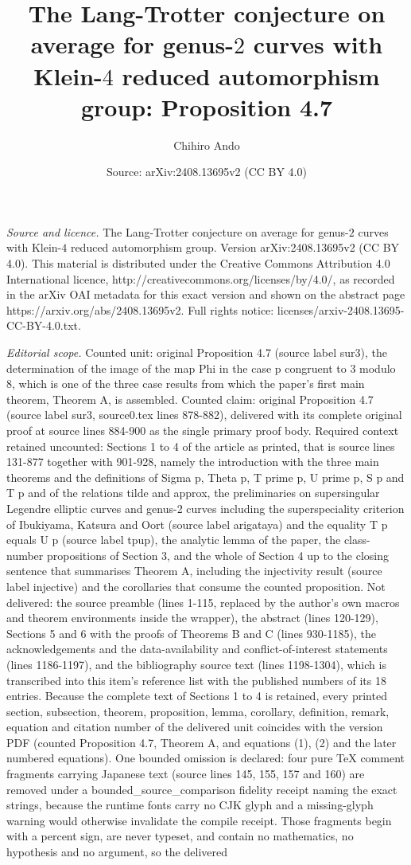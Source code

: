 \documentclass[10pt,a4paper]{amsart}
\title[The Lang-Trotter conjecture on average for genus-2 curves: Proposition4.7]{The Lang-Trotter conjecture on average for genus-$2$ curves with Klein-$4$ reduced automorphism group: Proposition 4.7}
\author{Chihiro Ando}
\date{Source: arXiv:2408.13695v2 (CC BY 4.0)}
\theoremstyle{plain}
\begin{document}
\maketitle
\noindent\emph{Source and licence.} The Lang-Trotter conjecture on average for genus-$2$ curves with Klein-$4$ reduced automorphism group. Version arXiv:2408.13695v2 (CC BY 4.0). This material is distributed under the Creative Commons Attribution 4.0 International licence, http://creativecommons.org/licenses/by/4.0/, as recorded in the arXiv OAI metadata for this exact version and shown on the abstract page https://arxiv.org/abs/2408.13695v2. Full rights notice: licenses/arxiv-2408.13695-CC-BY-4.0.txt.\par\smallskip
\noindent\textit{Editorial scope.} Counted unit: original Proposition 4.7 (source label sur3), the determination of the image of the map Phi in the case p congruent to 3 modulo 8, which is one of the three case results from which the paper's first main theorem, Theorem A, is assembled. Counted claim: original Proposition 4.7 (source label sur3, source0.tex lines 878-882), delivered with its complete original proof at source lines 884-900 as the single primary proof body. Required context retained uncounted: Sections 1 to 4 of the article as printed, that is source lines 131-877 together with 901-928, namely the introduction with the three main theorems and the definitions of Sigma p, Theta p, T prime p, U prime p, S p and T p and of the relations tilde and approx, the preliminaries on supersingular Legendre elliptic curves and genus-2 curves including the superspeciality criterion of Ibukiyama, Katsura and Oort (source label arigataya) and the equality T p equals U p (source label tpup), the analytic lemma of the paper, the class-number propositions of Section 3, and the whole of Section 4 up to the closing sentence that summarises Theorem A, including the injectivity result (source label injective) and the corollaries that consume the counted proposition. Not delivered: the source preamble (lines 1-115, replaced by the author's own macros and theorem environments inside the wrapper), the abstract (lines 120-129), Sections 5 and 6 with the proofs of Theorems B and C (lines 930-1185), the acknowledgements and the data-availability and conflict-of-interest statements (lines 1186-1197), and the bibliography source text (lines 1198-1304), which is transcribed into this item's reference list with the published numbers of its 18 entries. Because the complete text of Sections 1 to 4 is retained, every printed section, subsection, theorem, proposition, lemma, corollary, definition, remark, equation and citation number of the delivered unit coincides with the version PDF (counted Proposition 4.7, Theorem A, and equations (1), (2) and the later numbered equations). One bounded omission is declared: four pure TeX comment fragments carrying Japanese text (source lines 145, 155, 157 and 160) are removed under a bounded\_source\_comparison fidelity receipt naming the exact strings, because the runtime fonts carry no CJK glyph and a missing-glyph warning would otherwise invalidate the compile receipt. Those fragments begin with a percent sign, are never typeset, and contain no mathematics, no hypothesis and no argument, so the delivered 
\end{document}
